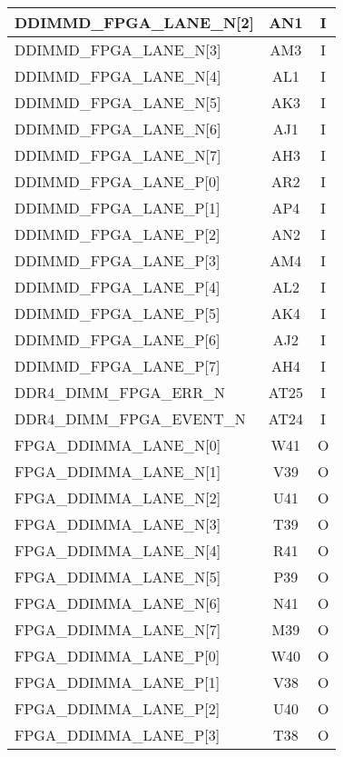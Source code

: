 \begin{longtable}[l]{| l | c | c |}
  DDIMMD\_FPGA\_LANE\_N[2]     & AN1  & I   \\ \hline
  DDIMMD\_FPGA\_LANE\_N[3]     & AM3  & I   \\ \hline
  DDIMMD\_FPGA\_LANE\_N[4]     & AL1  & I   \\ \hline
  DDIMMD\_FPGA\_LANE\_N[5]     & AK3  & I   \\ \hline
  DDIMMD\_FPGA\_LANE\_N[6]     & AJ1  & I   \\ \hline
  DDIMMD\_FPGA\_LANE\_N[7]     & AH3  & I   \\ \hline
  DDIMMD\_FPGA\_LANE\_P[0]     & AR2  & I   \\ \hline
  DDIMMD\_FPGA\_LANE\_P[1]     & AP4  & I   \\ \hline
  DDIMMD\_FPGA\_LANE\_P[2]     & AN2  & I   \\ \hline
  DDIMMD\_FPGA\_LANE\_P[3]     & AM4  & I   \\ \hline
  DDIMMD\_FPGA\_LANE\_P[4]     & AL2  & I   \\ \hline
  DDIMMD\_FPGA\_LANE\_P[5]     & AK4  & I   \\ \hline
  DDIMMD\_FPGA\_LANE\_P[6]     & AJ2  & I   \\ \hline
  DDIMMD\_FPGA\_LANE\_P[7]     & AH4  & I   \\ \hline
  DDR4\_DIMM\_FPGA\_ERR\_N     & AT25 & I   \\ \hline
  DDR4\_DIMM\_FPGA\_EVENT\_N   & AT24 & I   \\ \hline
  FPGA\_DDIMMA\_LANE\_N[0]     & W41  & O   \\ \hline
  FPGA\_DDIMMA\_LANE\_N[1]     & V39  & O   \\ \hline
  FPGA\_DDIMMA\_LANE\_N[2]     & U41  & O   \\ \hline
  FPGA\_DDIMMA\_LANE\_N[3]     & T39  & O   \\ \hline
  FPGA\_DDIMMA\_LANE\_N[4]     & R41  & O   \\ \hline
  FPGA\_DDIMMA\_LANE\_N[5]     & P39  & O   \\ \hline
  FPGA\_DDIMMA\_LANE\_N[6]     & N41  & O   \\ \hline
  FPGA\_DDIMMA\_LANE\_N[7]     & M39  & O   \\ \hline
  FPGA\_DDIMMA\_LANE\_P[0]     & W40  & O   \\ \hline
  FPGA\_DDIMMA\_LANE\_P[1]     & V38  & O   \\ \hline
  FPGA\_DDIMMA\_LANE\_P[2]     & U40  & O   \\ \hline
  FPGA\_DDIMMA\_LANE\_P[3]     & T38  & O   \\ \hline

\end{longtable}
